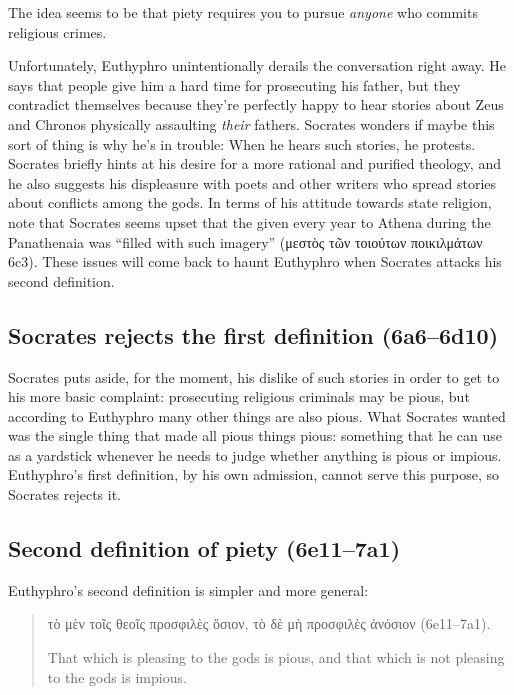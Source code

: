 \documentclass[11pt]{article}
\begin{document}
The idea seems to be that piety requires you to pursue \emph{anyone} who commits religious crimes.

Unfortunately, Euthyphro unintentionally derails the conversation right away.  He says that people give him a hard time for prosecuting his father, but they contradict themselves because they're perfectly happy to hear stories about Zeus and Chronos physically assaulting \emph{their} fathers.  Socrates wonders if maybe this sort of thing is why he's in trouble: When he hears such stories, he protests.  Socrates briefly hints at his desire for a more rational and purified theology, and he also suggests his displeasure with poets and other writers who spread stories about conflicts among the gods.  In terms of his attitude towards state religion, note that Socrates seems upset that the  given every year to Athena during the Panathenaia was ``filled with such imagery'' ({\g μεστὸς τῶν τοιούτων ποικιλμάτων} 6c3).  These issues will come back to haunt Euthyphro when Socrates attacks his second definition.


\subsection{Socrates rejects the first definition (6a6--6d10)}

Socrates puts aside, for the moment, his dislike of such stories in order to get to his more basic complaint: prosecuting religious criminals may be pious, but according to Euthyphro many other things are also pious.  What Socrates wanted was the single thing that made all pious things pious: something that he can use as a yardstick whenever he needs to judge whether anything is pious or impious.  Euthyphro's first definition, by his own admission, cannot serve this purpose, so Socrates rejects it.


\subsection{Second definition of piety (6e11--7a1)}

Euthyphro's second definition is simpler and more general:

\begin{quote}

    {\g
    τὸ μὲν τοῖς θεοῖς προσφιλὲς ὅσιον, τὸ δὲ μὴ προσφιλὲς ἀνόσιον
    } (6e11--7a1).

    That which is pleasing to the gods is pious, and that which is not
    pleasing to the gods is impious.

\end{quote}
\end{document}
